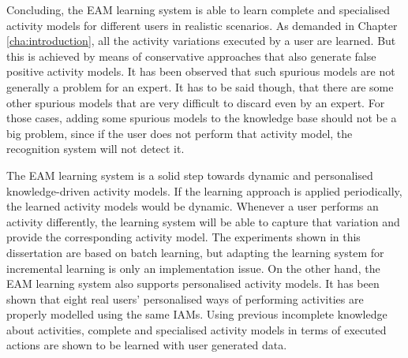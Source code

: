 Concluding, the EAM learning system is able to learn complete and specialised activity models for different users in realistic scenarios. As demanded in Chapter \ref{cha:introduction}, all the activity variations executed by a user are learned. But this is achieved by means of conservative approaches that also generate false positive activity models. It has been observed that such spurious models are not generally a problem for an expert. It has to be said though, that there are some other spurious models that are very difficult to discard even by an expert. For those cases, adding some spurious models to the knowledge base should not be a big problem, since if the user does not perform that activity model, the recognition system will not detect it. 

The EAM learning system is a solid step towards dynamic and personalised knowledge-driven activity models. If the learning approach is applied periodically, the learned activity models would be dynamic. Whenever a user performs an activity differently, the learning system will be able to capture that variation and provide the corresponding activity model. The experiments shown in this dissertation are based on batch learning, but adapting the learning system for incremental learning is only an implementation issue. On the other hand, the EAM learning system also supports personalised activity models. It has been shown that eight real users' personalised ways of performing activities are properly modelled using the same IAMs. Using previous incomplete knowledge about activities, complete and specialised activity models in terms of executed actions are shown to be learned with user generated data.